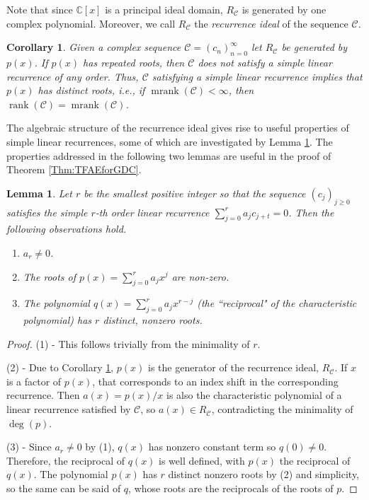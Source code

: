 \documentclass[12pt,reqno]{article}
\newtheorem{lemma}{Lemma}
\newtheorem{cor}{Corollary}
\DeclareMathOperator{\mrank}{mrank}
\DeclareMathOperator{\rank}{rank}
\begin{document}
Note that since $\mathbb{C}[x]$ is a principal ideal domain, $R_{\mathcal{C}}$ is generated by one complex polynomial. Moreover, we call $R_{\mathcal{C}}$ the {\em recurrence ideal} of the sequence $\mathcal{C}$. 

\begin{cor}\label{Cor:SimpleGenerator}
Given a complex sequence $\mathcal{C} = (c_n)_{n=0}^\infty$ let $R_{\mathcal{C}}$ be generated by $p(x)$. If $p(x)$ has repeated roots, then $\mathcal{C}$ does not satisfy a simple linear recurrence of any order. Thus, $\mathcal{C}$ satisfying a simple linear recurrence implies that $p(x)$ has distinct roots, i.e., if $\mrank(\mathcal{C}) <\infty$, then $\rank(\mathcal{C}) = \mrank(\mathcal{C})$. 
\end{cor}

The algebraic structure of the recurrence ideal gives rise to useful properties of simple linear recurrences, some of which are investigated by Lemma \ref{Lem:SimpleHelp}. The properties addressed in the following two lemmas are useful in the proof of Theorem \ref{Thm:TFAEforGDC}.

\begin{lemma}\label{Lem:SimpleHelp}
Let $r$ be the smallest positive integer so that the sequence $(c_j)_{j \geq 0}$ satisfies the simple $r$-th order linear recurrence $\sum_{j=0}^r a_j c_{j+t} = 0$. Then the following observations hold. 
\begin{enumerate}
\item $a_r\neq 0$. 
\item The roots of $p(x) = \sum_{j=0}^r a_j x^{j}$ are non-zero.
\item The polynomial $q(x) = \sum_{j=0}^r a_j x^{r-j}$ (the ``reciprocal" of the characteristic polynomial) has $r$ distinct, nonzero roots. 
\end{enumerate}
\end{lemma}
\begin{proof}
(1) - This follows trivially from the minimality of $r$. 

(2) - Due to Corollary \ref{Cor:SimpleGenerator}, $p(x)$ is the generator of the recurrence ideal, $R_{\mathcal{C}}$. If $x$ is a factor of $p(x)$, that corresponds to an index shift in the corresponding recurrence. Then $a(x) = p(x)/x$ is also the characteristic polynomial of a linear recurrence satisfied by $\mathcal{C}$, so $a(x)\in R_{\mathcal{C}}$, contradicting the minimality of $\deg(p)$.

(3) - Since $a_r\neq 0$ by (1), $q(x)$ has nonzero constant term so $q(0) \neq 0$. Therefore, the reciprocal of $q(x)$ is well defined, with $p(x)$ the reciprocal of $q(x)$. The polynomial $p(x)$ has $r$ distinct nonzero roots by (2) and simplicity, so the same can be said of $q$, whose roots are the reciprocals of the roots of $p$. 
\end{proof}
\end{document}
